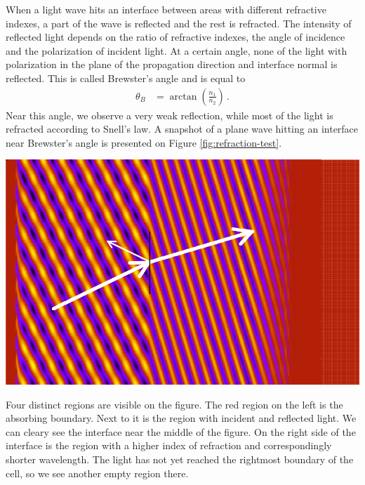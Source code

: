 \documentclass[a4paper,10pt]{article}
\renewenvironment{figure}
  {\par\medskip\noindent\minipage{\linewidth}}
  {\endminipage\par\medskip}
\begin{document}
\begin{multicols}{2}
When a light wave hits an interface between areas with different refractive indexes, a part of the wave is reflected and the rest is refracted. 
The intensity of reflected light depends on the ratio of refractive indexes, the angle of incidence and the polarization of incident light. 
At a certain angle, none of the light with polarization in the plane of the propagation direction and interface normal is reflected. 
This is called Brewster's angle and is equal to
\begin{align}
 \theta_B &= \arctan\left(\frac{n_1}{n_2}\right)\,.
\end{align}
Near this angle, we observe a very weak reflection, while most of the light is refracted according to Snell's law. 
A snapshot of a plane wave hitting an interface near Brewster's angle is presented on Figure \ref{fig:refraction-test}. 

\begin{figure}
 \centering
 \includegraphics[width=\textwidth]{refraction_t}
 \label{fig:refraction-test}
\end{figure}

Four distinct regions are visible on the figure. 
The red region on the left is the absorbing boundary. 
Next to it is the region with incident and reflected light. 
We can cleary see the interface near the middle of the figure. 
On the right side of the interface is the region with a higher index of refraction and correspondingly shorter wavelength. 
The light has not yet reached the rightmost boundary of the cell, so we see another empty region there. 


\end{multicols}
\end{document}
